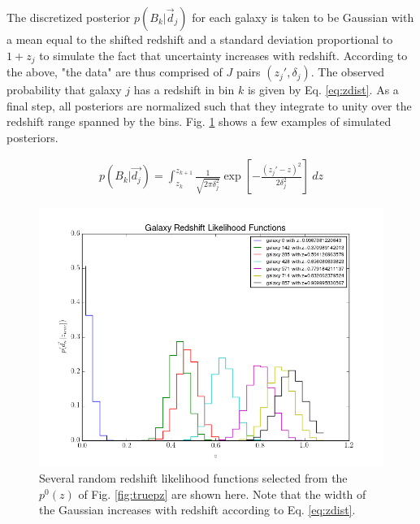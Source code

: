 \documentclass[12pt, onecolumn]{emulateapj}
\begin{document}

The discretized posterior $p(B_{k}|\vec{d}_{j})$ for each galaxy is taken to be Gaussian with a mean equal to the shifted redshift and a standard deviation proportional to $1+z_{j}$ to simulate the fact that uncertainty increases with redshift.  According to the above, "the data" are thus comprised of $J$ pairs $(z_{j}',\delta_{j})$.  The observed probability that galaxy $j$ has a redshift in bin $k$ is given by Eq. \ref{eq:zdist}.  As a final step, all posteriors are normalized such that they integrate to unity over the redshift range spanned by the bins.  Fig. \ref{fig:pzs} shows a few examples of simulated posteriors.

\begin{eqnarray}
\label{eq:zdist}
p(B_{k}|\vec{d_{j}}) = \int_{z_{k}}^{z_{k+1}} \frac{1}{\sqrt{2\pi\delta_{j}^{2}}}\exp\left[-\frac{(z_{j}'-z)^{2}}{2\delta_{j}^{2}}\right]\ dz
\end{eqnarray}

\begin{figure}
\label{fig:pzs}
\includegraphics[scale=0.5]{lik-samps.png}
\caption{Several random redshift likelihood functions selected from the $p^{0}(z)$ of Fig. \ref{fig:truepz} are shown here.  Note that the width of the Gaussian increases with redshift according to Eq. \ref{eq:zdist}.}
\end{figure}
\end{document}
